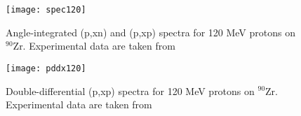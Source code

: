 \begin{figure}
\centering\texttt{[image: spec120]}
\caption{Angle-integrated (p,xn) and (p,xp) spectra for 120 MeV protons
on ${}^{90}$Zr. Experimental data are taken from \protect\cite{Cowley1991,Scobel1990}}
\label{spec120}
\end{figure}
\begin{figure}
\centering\texttt{[image: pddx120]}
\caption{Double-differential (p,xp) spectra for 120 MeV protons
on ${}^{90}$Zr. Experimental data are taken from \protect\cite{Cowley1991} }
\label{pddx120}
\end{figure}
